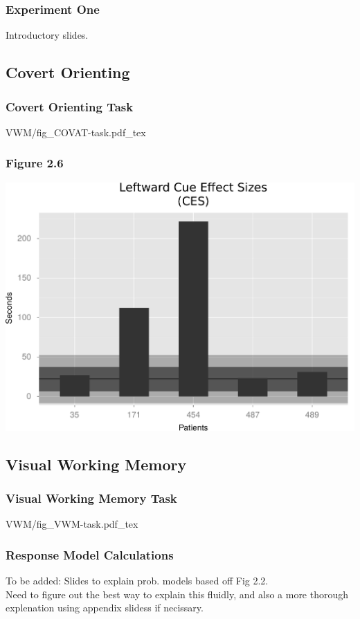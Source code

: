 \documentclass{beamer}
\begin{document}
\begin{frame}
	\frametitle{Experiment One}
	Introductory slides.
\end{frame}


\subsection*{Covert Orienting}
\begin{frame}
	\frametitle{Covert Orienting Task}
	\def\svgwidth{\textwidth}
	{VWM/fig_COVAT-task.pdf_tex}
\end{frame}


\subsection*{Visual Working Memory}

\begin{frame}
	\frametitle{Visual Working Memory Task}
	\def\svgwidth{\textwidth}
	{VWM/fig_VWM-task.pdf_tex}
\end{frame}

\begin{frame}
	\frametitle{Response Model Calculations}
	To be added: Slides to explain prob. models based off Fig 2.2.\\
	Need to figure out the best way to explain this fluidly, and also a more thorough
	explenation using appendix slidess if necissary.
\end{frame}
\end{document}
